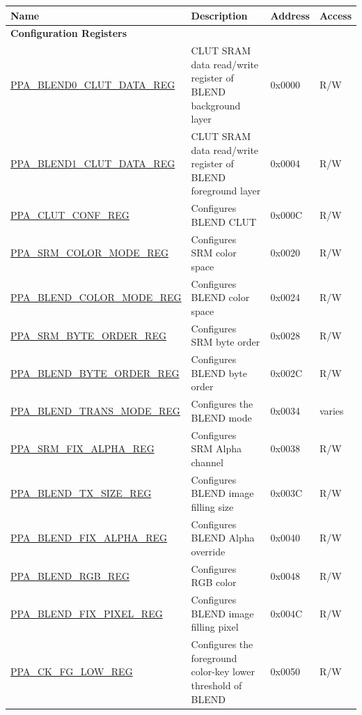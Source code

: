 \begin{longtable}{ | p{6cm} | p{7.2cm} | p{1.3cm} | p{1cm} | }
\hline\rowcolor{lightgray}
Name & Description &  Address & Access \\ \hline
\endhead
\multicolumn{4}{|l|}{\textbf{Configuration Registers}} \\ \hline
\hyperref[regdesc:PPABLEND0CLUTDATAREG]{PPA\_BLEND0\_CLUT\_DATA\_REG} & CLUT SRAM data read/write register of BLEND background layer & 0x0000 & R/W \\ \hline
\hyperref[regdesc:PPABLEND1CLUTDATAREG]{PPA\_BLEND1\_CLUT\_DATA\_REG} & CLUT SRAM data read/write register of BLEND foreground layer & 0x0004 & R/W \\ \hline
\hyperref[regdesc:PPACLUTCONFREG]{PPA\_CLUT\_CONF\_REG} & Configures BLEND CLUT & 0x000C & R/W \\ \hline
\hyperref[regdesc:PPASRMCOLORMODEREG]{PPA\_SRM\_COLOR\_MODE\_REG} & Configures SRM color space & 0x0020 & R/W \\ \hline
\hyperref[regdesc:PPABLENDCOLORMODEREG]{PPA\_BLEND\_COLOR\_MODE\_REG} & Configures BLEND color space & 0x0024 & R/W \\ \hline
\hyperref[regdesc:PPASRMBYTEORDERREG]{PPA\_SRM\_BYTE\_ORDER\_REG} & Configures SRM byte order & 0x0028 & R/W \\ \hline
\hyperref[regdesc:PPABLENDBYTEORDERREG]{PPA\_BLEND\_BYTE\_ORDER\_REG} & Configures BLEND byte order & 0x002C & R/W \\ \hline
\hyperref[regdesc:PPABLENDTRANSMODEREG]{PPA\_BLEND\_TRANS\_MODE\_REG} & Configures the BLEND mode & 0x0034 & varies \\ \hline
\hyperref[regdesc:PPASRMFIXALPHAREG]{PPA\_SRM\_FIX\_ALPHA\_REG} & Configures SRM Alpha channel & 0x0038 & R/W \\ \hline
\hyperref[regdesc:PPABLENDTXSIZEREG]{PPA\_BLEND\_TX\_SIZE\_REG} & Configures BLEND image filling size & 0x003C & R/W \\ \hline
\hyperref[regdesc:PPABLENDFIXALPHAREG]{PPA\_BLEND\_FIX\_ALPHA\_REG} & Configures BLEND Alpha override & 0x0040 & R/W \\ \hline
\hyperref[regdesc:PPABLENDRGBREG]{PPA\_BLEND\_RGB\_REG} & Configures RGB color & 0x0048 & R/W \\ \hline
\hyperref[regdesc:PPABLENDFIXPIXELREG]{PPA\_BLEND\_FIX\_PIXEL\_REG} & Configures BLEND image filling pixel & 0x004C & R/W \\ \hline
\hyperref[regdesc:PPACKFGLOWREG]{PPA\_CK\_FG\_LOW\_REG} & Configures the foreground color-key lower threshold of BLEND & 0x0050 & R/W \\ \hline

\end{longtable}
